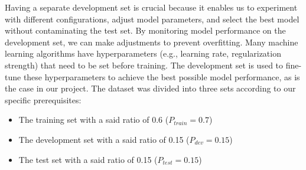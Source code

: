 \documentclass[11pt,onside]{article}
\begin{document}
Having a separate development set is crucial because it enables us to experiment with different configurations, adjust model parameters, and select the best model without contaminating the test set. By monitoring model performance on the development set, we can make adjustments to prevent overfitting. Many machine learning algorithms have hyperparameters (e.g., learning rate, regularization strength) that need to be set before training. The development set is used to fine-tune these hyperparameters to achieve the best possible model performance, as is the case in our project.
\newline\newline
The dataset was divided into three sets according to our specific prerequisites:
\begin{itemize}
    \item The training set with a said ratio of 0.6 (\(P_{train} = 0.7\))
    \item The development set with a said ratio of 0.15 (\(P_{dev} = 0.15\))
    \item The test set with a said ratio of 0.15 (\(P_{test} = 0.15\))
\end{itemize}
\end{document}
